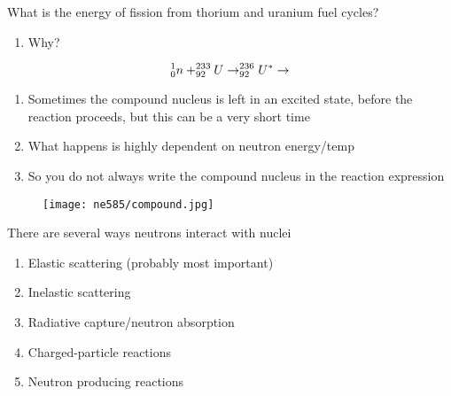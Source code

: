 \documentclass[aspectratio=1610,pdftex,dvipsnames,compress,xcolor={dvipsnames}]{beamer}
\begin{document}
\addtocounter{framenumber}{-1} 
\begin{frame}{What is the energy of fission from thorium and uranium fuel cycles?}
    \begin{enumerate}[series=outerlist,topsep=0pt,itemsep=21pt,leftmargin=*,label=(\arabic*)]
        \item[]Why?
    \end{enumerate}

    \vspace*{\fill}

    \begin{equation}
        \LARGE
        ^1_0n + ^{233}_{92}U \rightarrow ^{236}_{92}U^{*} \rightarrow   
    \end{equation}

    \vspace*{\fill}

    \begin{enumerate}[series=outerlist,topsep=0pt,itemsep=21pt,leftmargin=*,label=(\arabic*)]
        \item[]Sometimes the compound nucleus is left in an excited state, before the reaction proceeds, but this can be a very short time
        \item[]What happens is highly dependent on neutron energy/temp
        \item[]So you do not always write the compound nucleus in the reaction expression
    \end{enumerate}
\end{frame}


\begin{frame}{}
    \begin{figure}
        \centering
        \texttt{[image: ne585/compound.jpg]}
    \end{figure}
\end{frame}


\begin{frame}{There are several ways neutrons interact with nuclei}
    \begin{enumerate}[series=outerlist,topsep=0pt,itemsep=21pt,leftmargin=*,label=(\arabic*)]
        \item Elastic scattering (probably most important)
        \item Inelastic scattering
        \item Radiative capture/neutron absorption
        \item Charged-particle reactions
        \item Neutron producing reactions
    \end{enumerate}
\end{frame}
\end{document}
